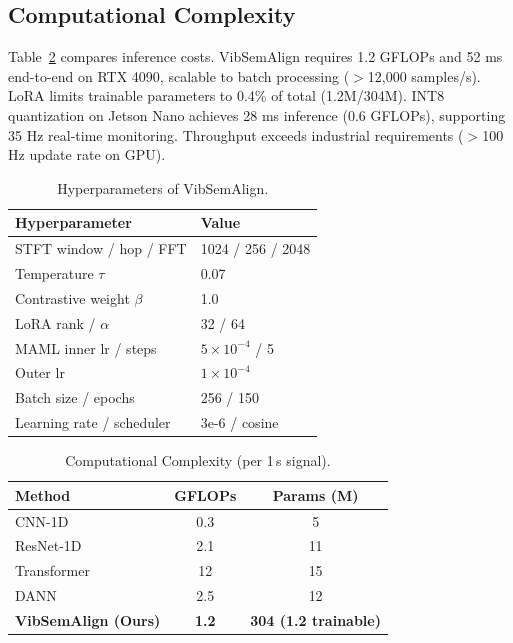 \subsection{Computational Complexity}

Table~\ref{tab:complexity} compares inference costs. VibSemAlign requires 1.2 GFLOPs and 52 ms end-to-end on RTX 4090, scalable to batch processing ($>$12,000 samples/s). LoRA limits trainable parameters to 0.4\% of total (1.2M/304M). INT8 quantization on Jetson Nano achieves 28 ms inference (0.6 GFLOPs), supporting 35 Hz real-time monitoring. Throughput exceeds industrial requirements ($>$100 Hz update rate on GPU).

\begin{table}[t]
\centering
\caption{Hyperparameters of VibSemAlign.}
\label{tab:hyperparameters}
\begin{tabular}{@{}ll@{}}
\toprule
Hyperparameter & Value \\
\midrule
STFT window / hop / FFT & 1024 / 256 / 2048 \\
Temperature $\tau$ & 0.07 \\
Contrastive weight $\beta$ & 1.0 \\
LoRA rank / $\alpha$ & 32 / 64 \\
MAML inner lr / steps & $5\times10^{-4}$ / 5 \\
Outer lr & $1\times10^{-4}$ \\
Batch size / epochs & 256 / 150 \\
Learning rate / scheduler & 3e-6 / cosine \\
\bottomrule
\end{tabular}
\end{table}

\begin{table}[t]
\centering
\caption{Computational Complexity (per 1\,s signal).}
\label{tab:complexity}
\begin{tabular}{@{}lcc@{}}
\toprule
Method & GFLOPs & Params (M) \\
\midrule
CNN-1D \cite{cite4} & 0.3 & 5 \\
ResNet-1D \cite{cite5} & 2.1 & 11 \\
Transformer \cite{cite32} & 12 & 15 \\
DANN \cite{cite30} & 2.5 & 12 \\
\midrule
\textbf{VibSemAlign (Ours)} & \textbf{1.2} & \textbf{304 (1.2 trainable)} \\
\bottomrule
\end{tabular}
\end{table}

